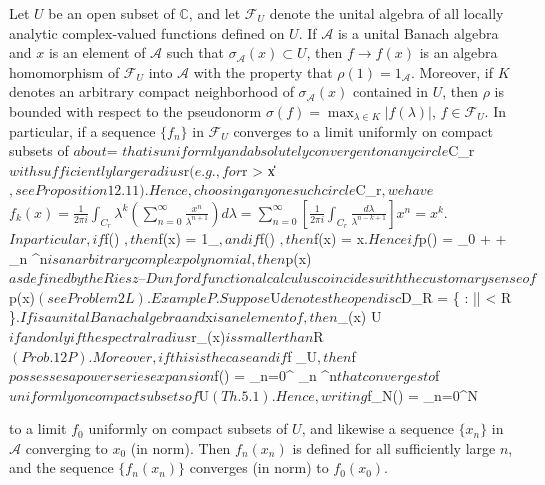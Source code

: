 Let $U$ be an open subset of $\mathbb{C}$, and let $\mathcal{F}_U$ denote the unital algebra of all locally analytic complex-valued functions defined on $U$. If $\mathcal{A}$ is a unital Banach algebra and $x$ is an element of $\mathcal{A}$ such that $\sigma_{\mathcal{A}}(x) \subset U$, then $f \rightarrow f(x)$ is an algebra homomorphism of $\mathcal{F}_U$ into $\mathcal{A}$ with the property that $\rho(1) = 1_{\mathcal{A}}$. Moreover, if $K$ denotes an arbitrary compact neighborhood of $\sigma_{\mathcal{A}}(x)$ contained in $U$, then $\rho$ is bounded with respect to the pseudonorm $\sigma(f) = \max_{\lambda \in K} |f(\lambda)|$, $f \in \mathcal{F}_U$. In particular, if a sequence $\{f_n\}$ in $\mathcal{F}_U$ converges to a limit uniformly on compact subsets of $

about $\lambda = \infty$ that is uniformly and absolutely convergent on any circle $C_r$ with sufficiently large radius $r$ (e.g., for $r > \|x\|$, see Proposition 12.11). Hence, choosing any one such circle $C_r$, we have

$$f_k(x) = \frac{1}{2\pi i} \int_{C_r} \lambda^k \left( \sum_{n=0}^{\infty} \frac{x^n}{\lambda^{n+1}} \right) d\lambda$$

$$= \sum_{n=0}^{\infty} \left[ \frac{1}{2\pi i} \int_{C_r} \frac{d\lambda}{\lambda^{n-k+1}} \right] x^n = x^k.$$

In particular, if $f(\lambda) $, then $f(x) = 1_{}$, and if $f(\lambda) \equiv \lambda$, then $f(x) = x$. Hence if $p(\lambda) = \alpha_0 + \cdots + \alpha_n \lambda^n$ is an arbitrary complex polynomial, then $p(x)$ as defined by the Riesz–Dunford functional calculus coincides with the customary sense of $p(x)$ (see Problem 2L).

Example P. Suppose $U$ denotes the open disc $D_R = \{ \lambda \in {} : |\lambda| < R \}$. If $$ is a unital Banach algebra and $x$ is an element of $$, then $\sigma_{}(x) \subset U$ if and only if the spectral radius $r_{}(x)$ is smaller than $R$ (Prob. 12P). Moreover, if this is the case and if $f \in {}_U$, then $f$ possesses a power series expansion $f(\lambda) = \sum_{n=0}^{\infty} \alpha_n \lambda^n$ that converges to $f$ uniformly on compact subsets of $U$ (Th. 5.1). Hence, writing $f_N(\lambda) = \sum_{n=0}^{N} \

to a limit $f_0$ uniformly on compact subsets of $U$, and likewise a sequence $\{x_n\}$ in $\mathcal{A}$ converging to $x_0$ (in norm). Then $f_n(x_n)$ is defined for all sufficiently large $n$, and the sequence $\{f_n(x_n)\}$ converges (in norm) to $f_0(x_0)$.
